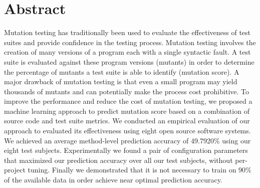 \chapter*{Abstract}
Mutation testing has traditionally been used to evaluate the effectiveness of test suites and provide confidence in the testing process. Mutation testing involves the creation of many versions of a program each with a single syntactic fault. A test suite is evaluated against these program versions (mutants) in order to determine the percentage of mutants a test suite is able to identify (mutation score). A major drawback of mutation testing is that even a small program may yield thousands of mutants and can potentially make the process cost prohibitive. To improve the performance and reduce the cost of mutation testing, we proposed a machine learning approach to predict mutation score based on a combination of source code and test suite metrics. We conducted an empirical evaluation of our approach to evaluated its effectiveness using eight open source software systems. We achieved an average method-level prediction accuracy of 49.7920\% using our eight test subjects. Experimentally we found a pair of configuration parameters that maximized our prediction accuracy over all our test subjects, without per-project tuning. Finally we demonstrated that it is not necessary to train on 90\% of the available data in order achieve near optimal prediction accuracy.
